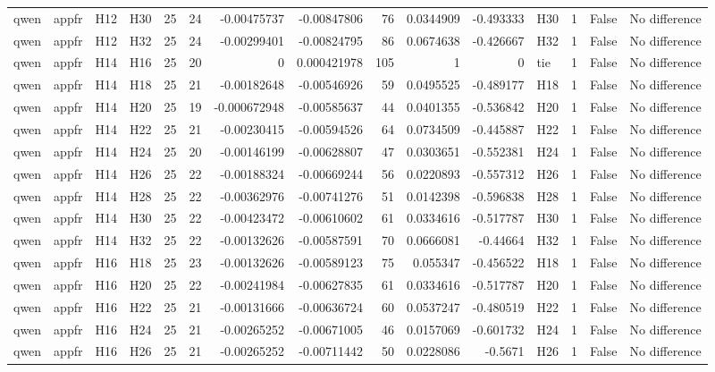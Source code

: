 \begin{longtable}{llllrrrrrrrlrrl}
qwen & appfr & H12 & H30 & 25 & 24 & -0.00475737 & -0.00847806 & 76 & 0.0344909 & -0.493333 & H30 & 1 & False & No difference \\
qwen & appfr & H12 & H32 & 25 & 24 & -0.00299401 & -0.00824795 & 86 & 0.0674638 & -0.426667 & H32 & 1 & False & No difference \\
qwen & appfr & H14 & H16 & 25 & 20 & 0 & 0.000421978 & 105 & 1 & 0 & tie & 1 & False & No difference \\
qwen & appfr & H14 & H18 & 25 & 21 & -0.00182648 & -0.00546926 & 59 & 0.0495525 & -0.489177 & H18 & 1 & False & No difference \\
qwen & appfr & H14 & H20 & 25 & 19 & -0.000672948 & -0.00585637 & 44 & 0.0401355 & -0.536842 & H20 & 1 & False & No difference \\
qwen & appfr & H14 & H22 & 25 & 21 & -0.00230415 & -0.00594526 & 64 & 0.0734509 & -0.445887 & H22 & 1 & False & No difference \\
qwen & appfr & H14 & H24 & 25 & 20 & -0.00146199 & -0.00628807 & 47 & 0.0303651 & -0.552381 & H24 & 1 & False & No difference \\
qwen & appfr & H14 & H26 & 25 & 22 & -0.00188324 & -0.00669244 & 56 & 0.0220893 & -0.557312 & H26 & 1 & False & No difference \\
qwen & appfr & H14 & H28 & 25 & 22 & -0.00362976 & -0.00741276 & 51 & 0.0142398 & -0.596838 & H28 & 1 & False & No difference \\
qwen & appfr & H14 & H30 & 25 & 22 & -0.00423472 & -0.00610602 & 61 & 0.0334616 & -0.517787 & H30 & 1 & False & No difference \\
qwen & appfr & H14 & H32 & 25 & 22 & -0.00132626 & -0.00587591 & 70 & 0.0666081 & -0.44664 & H32 & 1 & False & No difference \\
qwen & appfr & H16 & H18 & 25 & 23 & -0.00132626 & -0.00589123 & 75 & 0.055347 & -0.456522 & H18 & 1 & False & No difference \\
qwen & appfr & H16 & H20 & 25 & 22 & -0.00241984 & -0.00627835 & 61 & 0.0334616 & -0.517787 & H20 & 1 & False & No difference \\
qwen & appfr & H16 & H22 & 25 & 21 & -0.00131666 & -0.00636724 & 60 & 0.0537247 & -0.480519 & H22 & 1 & False & No difference \\
qwen & appfr & H16 & H24 & 25 & 21 & -0.00265252 & -0.00671005 & 46 & 0.0157069 & -0.601732 & H24 & 1 & False & No difference \\
qwen & appfr & H16 & H26 & 25 & 21 & -0.00265252 & -0.00711442 & 50 & 0.0228086 & -0.5671 & H26 & 1 & False & No difference \\

\end{longtable}
